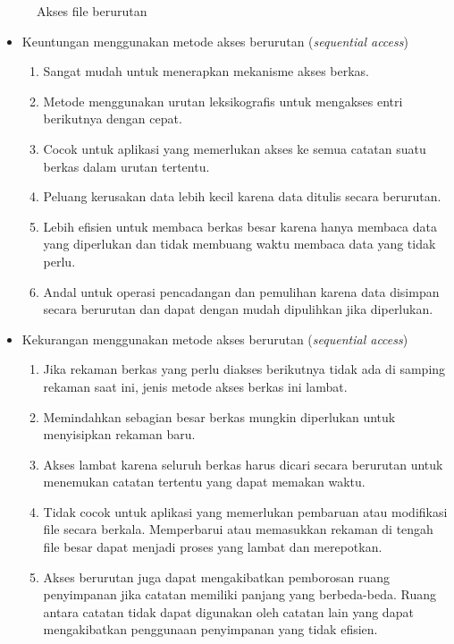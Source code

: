 \documentclass[12pt]{article}
\begin{document}
\begin{itemize}
\begin{figure}[h]
            \caption{Akses file berurutan}
        \end{figure}
        \begin{itemize}
            \item Keuntungan menggunakan metode akses berurutan (\textit{sequential access})
            \begin{enumerate}
                \item Sangat mudah untuk menerapkan mekanisme akses berkas.
                \item Metode menggunakan urutan leksikografis untuk mengakses entri berikutnya dengan cepat.
                \item Cocok untuk aplikasi yang memerlukan akses ke semua catatan suatu berkas dalam urutan tertentu.
                \item Peluang kerusakan data lebih kecil karena data ditulis secara berurutan.
                \item Lebih efisien untuk membaca berkas besar karena hanya membaca data yang diperlukan dan tidak membuang waktu membaca data yang tidak perlu.
                \item Andal untuk operasi pencadangan dan pemulihan karena data disimpan secara berurutan dan dapat dengan mudah dipulihkan jika diperlukan.
            \end{enumerate}
            \item Kekurangan menggunakan metode akses berurutan (\textit{sequential access})
            \begin{enumerate}
                \item Jika rekaman berkas yang perlu diakses berikutnya tidak ada di samping rekaman saat ini, jenis metode akses berkas ini lambat.
                \item Memindahkan sebagian besar berkas mungkin diperlukan untuk menyisipkan rekaman baru.
                \item Akses lambat karena seluruh berkas harus dicari secara berurutan untuk menemukan catatan tertentu yang dapat memakan waktu.
                \item Tidak cocok untuk aplikasi yang memerlukan pembaruan atau modifikasi file secara berkala. Memperbarui atau memasukkan rekaman di tengah file besar dapat menjadi proses yang lambat dan merepotkan.
                \item Akses berurutan juga dapat mengakibatkan pemborosan ruang penyimpanan jika catatan memiliki panjang yang berbeda-beda. Ruang antara catatan tidak dapat digunakan oleh catatan lain yang dapat mengakibatkan penggunaan penyimpanan yang tidak efisien.

\end{enumerate}
\end{itemize}
\end{itemize}
\end{document}
